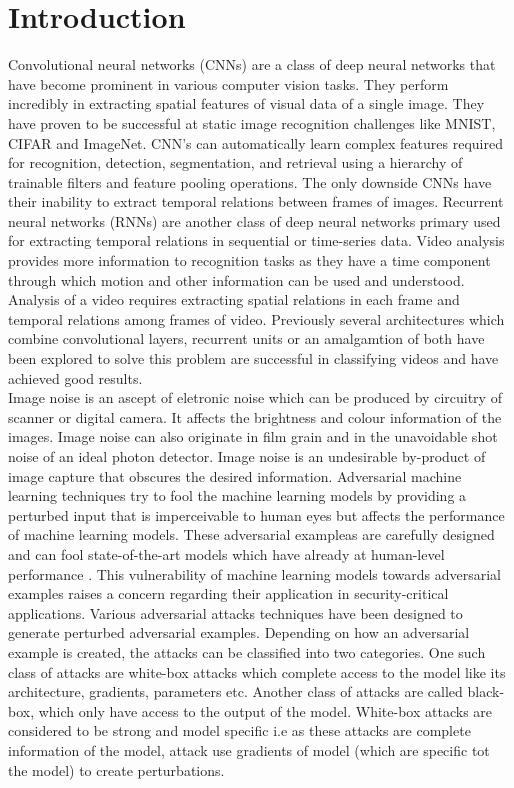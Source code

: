 \documentclass[10pt,twocolumn,letterpaper]{article}
\begin{document}
\section{Introduction}
\label{sec:intro}
Convolutional neural networks (CNNs) are a class of deep neural networks that have become prominent in various computer vision tasks. They perform incredibly in extracting spatial features of visual data of a single image. They have proven to be successful at static image recognition challenges like MNIST, CIFAR and ImageNet. CNN's can automatically learn complex features required for recognition, detection, segmentation, and retrieval using a hierarchy of trainable filters and feature pooling operations. The only downside CNNs have their inability to extract temporal relations between frames of images. Recurrent neural networks (RNNs) are another class of deep neural networks primary used for extracting temporal relations in sequential or time-series data. Video analysis provides more information to recognition tasks as they have a time component through which motion and other information can be used and understood. Analysis of a video requires extracting spatial relations in each frame and temporal relations among frames of video. Previously several architectures which combine convolutional layers, recurrent units or an amalgamtion of both have been explored to solve this problem \cite{abuelhaija2016youtube8m} \cite{ng2015short} are successful in classifying videos and have achieved good results.\\


Image noise is an ascept of eletronic noise which can be produced by circuitry of scanner or digital camera. It affects the brightness and colour information of the images. Image noise can also originate in film grain and in the unavoidable shot noise of an ideal photon detector. Image noise is an undesirable by-product of image capture that obscures the desired information. Adversarial machine learning techniques try to fool the machine learning models by providing a perturbed input that is imperceivable to human eyes but affects the performance of machine learning models. These adversarial exampleas are carefully designed and can fool state-of-the-art models which have already at human-level performance \cite{goodfellow2015explaining}. This vulnerability of machine learning models towards adversarial examples raises a concern regarding their application in security-critical applications. Various adversarial attacks techniques have been designed to generate perturbed adversarial examples. Depending on how an adversarial example is created, the attacks can be classified into two categories. One such class of attacks are white-box attacks which complete access to the model like its architecture, gradients, parameters etc. Another class of attacks are called black-box, which only have access to the output of the model. White-box attacks are considered to be strong and model specific i.e as these attacks are complete information of the model, attack use gradients of model (which are specific tot the model) to create perturbations.
\end{document}
